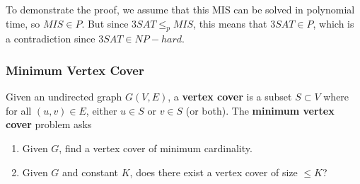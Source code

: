 \documentclass{article}
\begin{document}
\begin{example}
        To demonstrate the proof, we assume that this MIS can be solved in polynomial time, so $MIS \in P$. But since $3SAT \leq_p MIS$, this means that $3SAT \in P$, which is a contradiction since $3SAT \in NP-hard$. 
      \end{example} 

    \subsubsection{Minimum Vertex Cover}

      \begin{definition}
        Given an undirected graph $G(V, E)$, a \textbf{vertex cover} is a subset $S \subset V$ where for all $(u, v) \in E$, either $u \in S$ or $v \in S$ (or both). The \textbf{minimum vertex cover} problem asks 
        \begin{enumerate}
          \item Given $G$, find a vertex cover of minimum cardinality. 
          \item Given $G$ and constant $K$, does there exist a vertex cover of size $\leq K$? 
        \end{enumerate}
      \end{definition}
\end{document}
